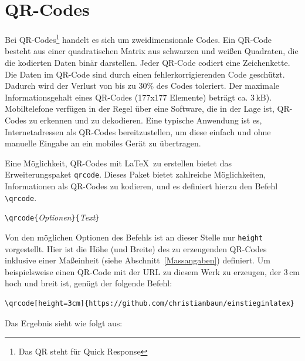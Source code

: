 \documentclass[a4paper,10pt,twoside]{scrbook}
\begin{document}
{\section{QR-Codes}
\label{Abschnitt_QR-Code}

Bei QR-Codes\footnote{Das QR steht für Quick Response} handelt es sich um zweidimensionale Codes.
Ein QR-Code besteht aus einer quadratischen Matrix aus schwarzen und weißen Quadraten, die die kodierten Daten binär darstellen. Jeder QR-Code codiert eine Zeichenkette.
Die Daten im QR-Code sind durch einen fehlerkorrigierenden Code geschützt. 
Dadurch wird der Verlust von bis zu 30\% des Codes toleriert.
Der maximale Informationsgehalt eines QR-Codes (177x177 Elemente) beträgt ca. 3\,kB).~\cite{QRCode_Wikipedia}
Mobiltelefone verfügen in der Regel über eine Software, die in der 
Lage ist, QR-Codes zu erkennen und zu dekodieren. Eine typische Anwendung ist es, Internetadressen als
QR-Codes bereitzustellen, um diese einfach und ohne manuelle Eingabe an ein mobiles Gerät zu übertragen.

Eine Möglichkeit, QR-Codes mit \LaTeX\ zu erstellen bietet das Erweiterungspaket \verb!qrcode!. 
Dieses Paket bietet zahlreiche Möglichkeiten, Informationen als QR-Codes zu kodieren, und es definiert hierzu den 
Befehl \verb!\qrcode!.




\begin{boxedminipage}{\textwidth}
\texttt{\textbackslash qrcode\{}\textsl{Optionen}\texttt{\}\{}\textsl{Text}\texttt{\}}
\end{boxedminipage}


Von den möglichen Optionen des Befehls ist an dieser Stelle nur \verb!height! vorgestellt. Hier ist die Höhe (und Breite) des zu 
erzeugenden QR-Codes inklusive einer Maßeinheit 
(siehe Abschnitt~\ref{Massangaben}) definiert. Um beispielsweise einen QR-Code mit der URL zu diesem Werk zu erzeugen, der 3\,cm hoch und breit ist, 
genügt der folgende Befehl: 

\begin{lstlisting}[label=QRcode, style=customlatex]
\qrcode[height=3cm]{https://github.com/christianbaun/einstieginlatex}
\end{lstlisting}

Das Ergebnis sieht wie folgt aus:





}
\end{document}
